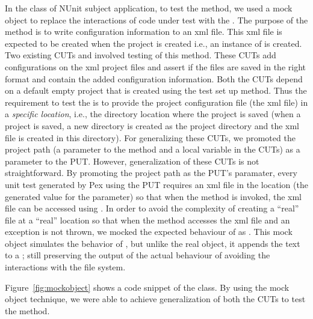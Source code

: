 In the  class of NUnit subject application, to test the  method, we used a mock object to replace the interactions of code under test with the . The purpose of the  method is to write configuration information to an xml file. This xml file is expected to be created when the project is created i.e., an instance of  is created. Two existing CUTs  and  involved testing of this method. These CUTs add configurations on the xml project files and assert if the files are saved in the right format and contain the added configuration information. Both the CUTs depend on a default empty project that is created using the test set up method. Thus the requirement to test the  is to provide the project configuration file (the xml file) in a \emph{specific location}, i.e., the directory location where the project is saved (when a project is saved, a new directory is created as the project directory and the xml file is created in this directory). For generalizing these CUTs, we promoted the project path (a parameter to the  method and a local variable in the CUTs) as a parameter to the PUT. However, generalization of these CUTs is not straightforward. By promoting the project path as the PUT's paramater, every unit test generated by Pex using the PUT requires an xml file in the location (the generated value for the parameter) so that when the  method is invoked, the xml file can be accessed using . In order to avoid the complexity of creating a ``real'' file at a ``real'' location so that when the  method accesses the xml file and an exception is not thrown, we mocked the expected behaviour of  as . This mock object simulates the behavior of , but unlike the real object, it appends the text to a ; still preserving the output of the actual behaviour of  avoiding the interactions with the file system. 

Figure~\ref{fig:mockobject} shows a code snippet of the  class. By using the mock object technique, we were able to achieve generalization of both the CUTs to test the  method.


